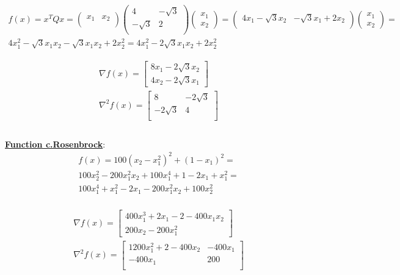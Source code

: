 \documentclass[fleqn]{article}
\begin{document}
\begin{multline*}
f(x) = x^T Q x =
\begin{pmatrix} x_1 & x_2 \\ \end{pmatrix}
\begin{pmatrix} 
	4         &	-\sqrt{3} \\ 
	-\sqrt{3} &2          \\ 
\end{pmatrix}
\begin{pmatrix} x_1 \\ x_2 \end{pmatrix}
=
\begin{pmatrix} 4x_1 -\sqrt{3}x_2 & -\sqrt{3}x_1+2x_2 \\ \end{pmatrix}
\begin{pmatrix} x_1 \\ x_2 \end{pmatrix}
= \\
4x_1^2 -\sqrt{3} x_1 x_2 - \sqrt{3} x_1 x_2 +2x_2^2 
=
4x_1^2 - 2\sqrt{3} x_1 x_2 +2x_2^2 
\end{multline*}

\begin{multline*}
\nabla f(x) =
\begin{bmatrix}
	8x_1 -2\sqrt{3}x_2 \\ 4x_2-2\sqrt{3}x_1
\end{bmatrix} \\
\nabla^2 f(x) =
\begin{bmatrix} 
	8 & -2\sqrt{3} \\ -2\sqrt{3} & 4 \\ 
\end{bmatrix} \\
\end{multline*} \\

\underline{\textbf{Function c.Rosenbrock}}:\\
\begin{multline*}
f(x) = 100(x_2-x_1^2)^2+(1-x_1)^2 = \\
100x_2^2-200x_1^2x_2+100x_1^4+1-2x_1+x_1^2 = \\
100x_1^4+x_1^2-2x_1-200x_1^2x_2+100x_2^2\\
\end{multline*}

\begin{multline*}
\nabla f(x) =
\begin{bmatrix}
	400x_1^3+2x_1-2-400x_1x_2 \\ 200x_2-200x_1^2
\end{bmatrix} \\
\nabla^2 f(x) =
\begin{bmatrix} 
	1200x_1^2+2-400x_2 & -400x_1 \\
	-400x_1            & 200     \\ 
\end{bmatrix} \\
\end{multline*} \\
\end{document}
